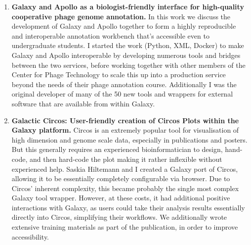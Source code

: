 \begin{enumerate}[label=\ref*{chapter:annotation}.\arabic*]
\itemsep-0.5em
\setcounter{enumi}{-1}
\item \textbf{\color{hexy-red}Galaxy and Apollo as a biologist-friendly interface for high-quality cooperative phage genome annotation.} In this work we discuss the development of Galaxy and Apollo together to form a highly reproducible and interoperable annotation workbench that's accessible even to undergraduate students. I started the work (Python, XML, Docker) to make Galaxy and Apollo interoperable by developing numerous tools and bridges between the two services, before working together with other members of the Center for Phage Technology to scale this up into a production service beyond the needs of their phage annotation course. Additionally I was the original developer of many of the 50 new tools and wrappers for external software that are available from within Galaxy.

\item \textbf{\color{hexy-red}Galactic Circos: User-friendly creation of Circos Plots within the Galaxy platform.} Circos is an extremely popular tool for visualisation of high dimension and genome scale data, especially in publications and posters. But this generally requires an experienced bioinformatician to design, hand-code, and then hard-code the plot making it rather inflexible without experienced help. Saskia Hiltemann and I created a Galaxy port of Circos, allowing it to be essentially completely configurable via browser. Due to Circos' inherent complexity, this became probably the single most complex Galaxy tool wrapper. However, at these costs, it had additional positive interactions with Galaxy, as users could take their analysis results essentially directly into Circos, simplifying their workflows. We additionally wrote extensive training materials as part of the publication, in order to improve accessibility.

\end{enumerate}
